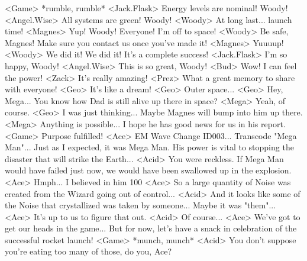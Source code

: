 <Game> *rumble, rumble* 
<Jack.Flask> Energy levels are nominal! Woody! 
<Angel.Wise> All systems are green! Woody! 
<Woody> At long last... launch time! 
<Magnes> Yup! Woody! Everyone! 
I'm off to space! 
<Woody> Be safe, Magnes! 
Make sure you contact us once you've made it! 
<Magnes> Yuuuup! 
<Woody> We did it! We did it! It's a complete success! 
<Jack.Flask> I'm so happy, Woody! 
<Angel.Wise> This is so great, Woody! 
<Bud> Wow! I can feel the power! 
<Zack> It's really amazing! 
<Prez> What a great memory to share with everyone! 
<Geo> It's like a dream! 
<Geo> Outer space... 
<Geo> Hey, Mega... You know how Dad is still alive up there in space? 
<Mega> Yeah, of course. 
<Geo> I was just thinking... Maybe Magnes will bump into him up there. 
<Mega> Anything is possible... I hope he has good news for us in his report. 
<Game> Purpose fulfilled! 
<Ace> EM Wave Change ID003... 
Transcode "Mega Man"... 
Just as I expected, it was Mega Man. 
His power is vital to stopping the disaster that will strike the Earth... 
<Acid> You were reckless. 
If Mega Man would have failed just now, we would 
have been swallowed up in the explosion. 
<Ace> Hmph... I believed in him 100%
<Ace> So a large quantity of Noise was created from 
the Wizard going out of control... 
<Acid> And it looks like some of the Noise that crystallized was taken by someone... 
Maybe it was "them"... 
<Ace> It's up to us to figure that out. 
<Acid> Of course... 
<Ace> We've got to get our heads in the game... 
But for now, let's have a snack in celebration of the successful rocket launch! 
<Game> *munch, munch* 
<Acid> You don't suppose you're eating too many of those, do you, Ace? 

